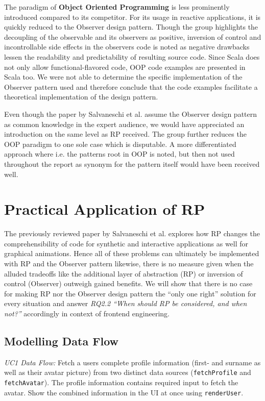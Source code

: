 \documentclass[12pt,a4paper]{article}
\begin{document}
The paradigm of \textbf{Object Oriented Programming} is less prominently introduced compared to its competitor. For its usage in reactive applications, it is quickly reduced to the Observer design pattern. Though the group highlights the decoupling of the observable and its observers as positive, inversion of control and incontrollable side effects in the observers code is noted as negative drawbacks lessen the readability and predictability of resulting source code. Since Scala does not only allow functional-flavored code, OOP code examples are presented in Scala too. We were not able to determine the specific implementation of the Observer pattern used and therefore conclude that the code examples facilitate a theoretical implementation of the design pattern.

Even though the paper by Salvaneschi et al. assume the Observer design pattern as common knowledge in the expert audience, we would have appreciated an introduction on the same level as RP received. The group further reduces the OOP paradigm to one sole case which is disputable. A more differentiated approach where i.e. the patterns root in OOP is noted, but then not used throughout the report as synonym for the pattern itself would have been received well.

\section{Practical Application of RP}
\label{sec:practical-application}

The previously reviewed paper by Salvaneschi et al. explores how RP changes the comprehensibility of code for synthetic and interactive applications as well for graphical animations. Hence all of these problems can ultimately be implemented with RP and the Observer pattern likewise, there is no measure given when the alluded tradeoffs like the additional layer of abstraction (RP) or inversion of control (Observer) outweigh gained benefits. We will show that there is no case for making RP nor the Observer design pattern the ``only one right'' solution for every situation and answer \emph{RQ2.2 ``When should RP be considered, and when not?''} accordingly in context of frontend engineering.

\subsection{Modelling Data Flow}

\begin{framed}
	\noindent\emph{UC1 Data Flow:} Fetch a users complete profile information (first- and surname as well as their avatar picture) from two distinct data sources (\texttt{fetchProfile} and \texttt{fetchAvatar}). The profile information contains required input to fetch the avatar. Show the combined information in the UI at once using \texttt{renderUser}.
\end{framed}
\end{document}
